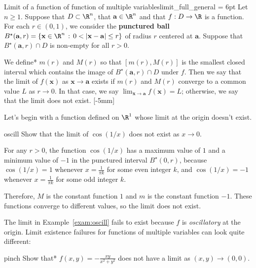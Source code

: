 \documentclass{watsonbook}
\begin{document}
\begin{defn}{Limit of a function of function of multiple
    variables}{limit_full_general} \parskip = 6pt Let $n \geq
  1$. Suppose that $D \subset \R^n$, that $\mathbf{a}\in \R^n$ and
  that $f:D \to \R$ is a function. For each $r \in (0,1)$, we consider
  the \textbf{punctured ball}
  $B^\star(\mathbf{a},r) = \{\mathbf{x} \in \R^n \,: \, 0 <
  \left|\mathbf{x} - \mathbf{a}\right| \leq r \}$ of radius $r$
  centered at $\mathbf{a}$. Suppose that $B^\star(\mathbf{a},r) \cap
  D$ is non-empty for all $r > 0$. 

  We define* $m(r)$ and $M(r)$ so that $[m(r),M(r)]$ is the smallest
  closed interval which contains the image of
  $B^\star(\mathbf{a},r) \cap D$ under $f$. Then we say that the limit
  of $f(\mathbf{x})$ as $\mathbf{x} \to \mathbf{a}$ exists if $m(r)$
  and $M(r)$ converge to a common value $L$ as $r \to 0$. In that
  case, we say
  $\displaystyle{\lim_{\mathbf{x} \to \mathbf{a}} f(\mathbf{x}) = L}$;
  otherwise, we say that the limit does not exist. [-5mm]
\end{defn}

Let's begin with a function defined on $\R^1$ whose limit at the
origin doesn't exist. 

\begin{example}{}{oscill}
  Show that the limit of $\cos (1/x)$ does not exist as $x\to0$. 
\end{example}

\begin{solution}
  For any $r>0$, the function $\cos(1/x)$ has a maximum value of $1$
  and a minimum value of $-1$ in the punctured interval
  $B^\star(0,r)$, because $\cos(1/x) = 1$ whenever $x = \tfrac{1}{\pi
    k}$ for some even integer $k$, and $\cos(1/x) = -1$ whenever $x=
  \tfrac{1}{\pi k}$ for some odd integer $k$.
  
  Therefore, $M$ is the constant function $1$ and $m$
  is the constant function $-1$. These functions converge to different
  values, so the limit does not exist. 
\end{solution}

The limit in Example~\ref{exam:oscill} fails to exist because $f$ is
\textit{oscillatory} at the origin. Limit existence failures for
functions of multiple variables can look quite different: 

\begin{example}{}{pinch}
  Show that* $f(x,y) = -\frac{xy}{x^2 + y^2}$ does not have a limit as
  $(x,y) \to (0,0)$. 
\end{example}
\end{document}
